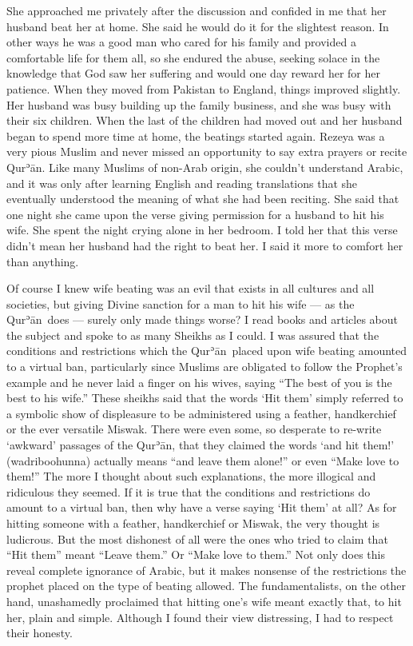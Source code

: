 \documentclass[12pt]{memoir}
\def\´{ʾ} %
\def \Quran{Qur\-\´ān} %
\begin{document}
She approached me privately after the discussion
and confided in me that her husband beat her at home.
She said he would do it for the slightest reason.
In other ways he was a good man who cared for his family
and provided a comfortable life for them all, so she endured the abuse,
seeking solace in the knowledge that God saw her suffering
and would one day reward her for her patience.
When they moved from Pakistan to England, things improved slightly.
Her husband was busy building up the family business,
and she was busy with their six children.
When the last of the children had moved out
and her husband began to spend more time at home,
the beatings started again.
Rezeya was a very pious Muslim and never missed an opportunity
to say extra prayers or recite \Quran.
Like many Muslims of non-Arab origin, she couldn’t understand Arabic,
and it was only after learning English and reading translations
that she eventually understood the meaning of what she had been reciting.
She said that one night she came upon the verse
giving permission for a husband to hit his wife.
She spent the night crying alone in her bedroom.
I told her that this verse didn’t mean her husband had the right to beat her.
I said it more to comfort her than anything.

Of course I knew wife beating was an evil that exists in all cultures
and all societies, but giving Divine sanction for a man to hit his wife —
as the \Quran\ does — surely only made things worse?
I read books and articles about the subject
and spoke to as many Sheikhs as I could.
I was assured that the conditions and restrictions
which the \Quran\ placed upon wife beating amounted to a virtual ban,
particularly since Muslims are obligated to follow the Prophet’s example
and he never laid a finger on his wives\footnotemark,
saying “The best of you is the best to his wife.”
These sheikhs said that the words ‘Hit them’ simply referred
to a symbolic show of displeasure to be administered
using a feather, handkerchief or the ever versatile Miswak.
There were even some, so desperate to re-write
‘awkward’ passages of the \Quran,
that they claimed the words ‘and hit them!’ (wadriboohunna)
actually means “and leave them alone!” or even “Make love to them!”
The more I thought about such explanations,
the more illogical and ridiculous they seemed.
If it is true that the conditions and restrictions do amount to a virtual ban,
then why have a verse saying ‘Hit them’ at all?
As for hitting someone with a feather, handkerchief or Miswak,
the very thought is ludicrous.
But the most dishonest of all were the ones who tried to claim
that “Hit them” meant “Leave them.”
Or “Make love to them.”
Not only does this reveal complete ignorance of Arabic,
but it makes nonsense of the restrictions the prophet
placed on the type of beating allowed.
The fundamentalists, on the other hand, unashamedly proclaimed
that hitting one’s wife meant exactly that, to hit her, plain and simple.
Although I found their view distressing, I had to respect their honesty.
\end{document}
